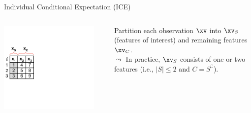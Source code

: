 \documentclass[11pt,compress,t,notes=noshow, aspectratio=169, xcolor=table]{beamer}
\begin{document}
\begin{frame}{Individual Conditional Expectation (ICE) }

\begin{columns}[T]
\begin{column}{0.16\textwidth} %
\includegraphics[page=1, trim=0cm 0.35cm 4.53cm 0.35cm, clip, width=0.9\textwidth]{figure_man/ice_plot_demo}
\end{column}
\begin{column}{0.84\textwidth}


Partition each observation $\xv$ into $\xv_S$ (features of interest) and remaining features $\xv_C$.\\
$\leadsto$ In practice, $\xv_S$ consists of one or two features (i.e., $|S| \leq 2$ and $C = S^\complement$).


\end{column}
\end{columns}
\end{frame}
\end{document}
